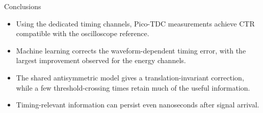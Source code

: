 \begin{frame}{Conclusions}
\small

\begin{itemize}
    \item Using the dedicated timing channels, Pico-TDC measurements achieve
    CTR compatible with the oscilloscope reference.

    \vspace{0.45em}

    \item Machine learning corrects the waveform-dependent timing error,
    with the largest improvement observed for the energy channels.

    \vspace{0.45em}

    \item The shared antisymmetric model gives a translation-invariant correction,
    while a few threshold-crossing times retain much of the useful information.

    \vspace{0.45em}

    \item Timing-relevant information can persist even nanoseconds after signal arrival. 
\end{itemize}

\vfill

\end{frame}
